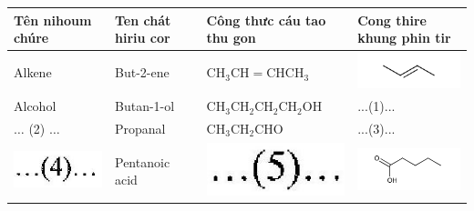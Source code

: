\documentclass[10pt]{article}
\begin{document}
\begin{center}
\begin{tabular}{|l|l|l|l|}
\hline
Tên nihoum chúre & Ten chát hiriu cor & Công thưc cáu tao thu gon & Cong thire khung phin tir \\
\hline
Alkene & But-2-ene & $\mathrm{CH}_{3} \mathrm{CH}=\mathrm{CHCH}_{3}$ & \includegraphics{smile-a75d4ea55ceb765b8cf310a69a3fb895b014b2ad} \\
\hline
Alcohol & Butan-1-ol & $\mathrm{CH}_{3} \mathrm{CH}_{2} \mathrm{CH}_{2} \mathrm{CH}_{2} \mathrm{OH}$ & ...(1)... \\
\hline
$\ldots$ (2) $\ldots$ & Propanal & $\mathrm{CH}_{3} \mathrm{CH}_{2} \mathrm{CHO}$ & ...(3)... \\
\hline
\includegraphics[max width=\textwidth]{2025_10_23_f2823ef970776205e47bg-34}
 & Pentanoic acid & \includegraphics[max width=\textwidth]{2025_10_23_f2823ef970776205e47bg-34(2)}
 & \includegraphics{smile-f826611fde2ef2ec56539e6c2d9d70082612bbfc} \\

\end{tabular}
\end{center}
\end{document}

